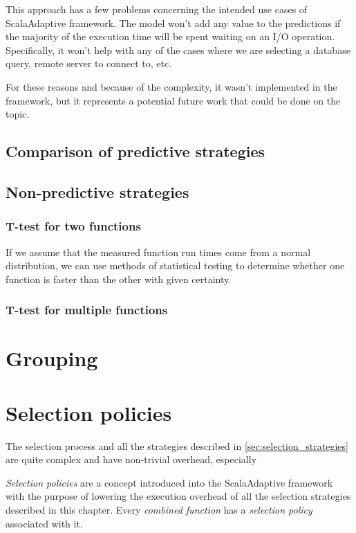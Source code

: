 This approach has a few problems concerning the intended use cases of ScalaAdaptive framework. The model won't add any value to the predictions if the majority of the execution time will be spent waiting on an I/O operation. Specifically, it won't help with any of the cases where we are selecting a database query, remote server to connect to, etc.

For these reasons and because of the complexity, it wasn't implemented in the framework, but it represents a potential future work that could be done on the topic.

\subsection{Comparison of predictive strategies}

\subsection{Non-predictive strategies}

\subsubsection{T-test for two functions}

If we assume that the measured function run times come from a normal distribution, we can use methods of statistical testing to determine whether one function is faster than the other with given certainty. 

\subsubsection{T-test for multiple functions}

\section{Grouping}

\section{Selection policies}

The selection process and all the strategies described in \ref{sec:selection_strategies} are quite complex and have non-trivial overhead, especially 

\textit{Selection policies} are a concept introduced into the ScalaAdaptive framework with the purpose of lowering the execution overhead of all the selection strategies described in this chapter. Every \textit{combined function} has a \textit{selection policy} associated with it.

